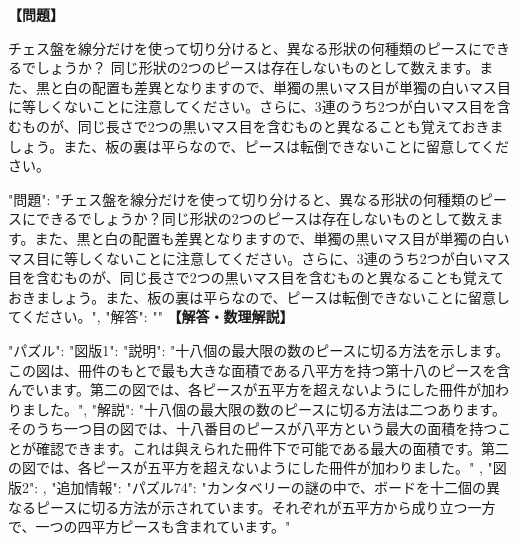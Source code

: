 \documentclass[10pt,a4paper,oneside,openany]{ltjsbook}
\begin{document}
\begin{tcolorbox}[colback=softblue,colframe=primaryblue,title=\textbf{第 293 問：THE CHINESE CHESSBOARD.},arc=2mm,boxrule=1pt,breakable]
\textbf{【問題】}\par\vspace{0.3em}
チェス盤を線分だけを使って切り分けると、異なる形狀の何種類のピースにできるでしょうか？
同じ形狀の2つのピースは存在しないものとして数えます。また、黒と白の配置も差異となりますので、単獨の黒いマス目が単獨の白いマス目に等しくないことに注意してください。さらに、3連のうち2つが白いマス目を含むものが、同じ長さで2つの黒いマス目を含むものと異なることも覚えておきましょう。また、板の裏は平らなので、ピースは転倒できないことに留意してください。

{
  "問題": "チェス盤を線分だけを使って切り分けると、異なる形狀の何種類のピースにできるでしょうか？同じ形狀の2つのピースは存在しないものとして数えます。また、黒と白の配置も差異となりますので、単獨の黒いマス目が単獨の白いマス目に等しくないことに注意してください。さらに、3連のうち2つが白いマス目を含むものが、同じ長さで2つの黒いマス目を含むものと異なることも覚えておきましょう。また、板の裏は平らなので、ピースは転倒できないことに留意してください。",
  "解答": ""
}
\tcblower
\textbf{【解答・数理解説】}\par\vspace{0.3em}
{
    "パズル": {
        "図版1": {
            "説明": "十八個の最大限の数のピースに切る方法を示します。この図は、冊件のもとで最も大きな面積である八平方を持つ第十八のピースを含んでいます。第二の図では、各ピースが五平方を超えないようにした冊件が加わりました。",
            "解説": "十八個の最大限の数のピースに切る方法は二つあります。そのうち一つ目の図では、十八番目のピースが八平方という最大の面積を持つことが確認できます。これは與えられた冊件下で可能である最大の面積です。第二の図では、各ピースが五平方を超えないようにした冊件が加わりました。"
        },
        "図版2": {
        }
    },
    "追加情報": {
        "パズル74": "カンタベリーの謎の中で、ボードを十二個の異なるピースに切る方法が示されています。それぞれが五平方から成り立つ一方で、一つの四平方ピースも含まれています。"
    }
}
\end{tcolorbox}
\end{document}
